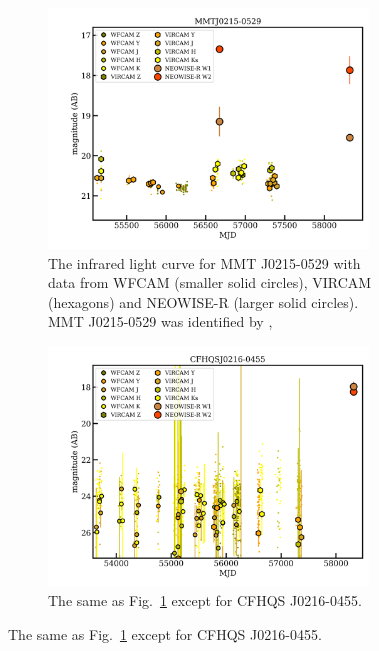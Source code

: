 \documentclass[usenatbib]{mnras}
\begin{document}
\begin{figure}
  \begin{subfigure}{}
    \centering
    \includegraphics[width=8.5cm]{../light_curves/MMTJ0215-0529LC_20190613.png}
    \caption{The infrared light curve for MMT J0215-0529 with data from 
      WFCAM (smaller solid circles), VIRCAM (hexagons) and NEOWISE-R (larger solid circles).
MMT  J0215-0529 was identified by \citet{McGreer2018}, 
}
    \label{fig:MMTJ0215-0529}
  \end{subfigure} 
  \begin{subfigure}{}
    \centering
    \includegraphics[width=8.5cm]{../light_curves/CFHQSJ0216-0455LC_20190613.png}
    \caption{The same as Fig.~\ref{fig:MMTJ0215-0529} except for CFHQS J0216-0455.}
    \label{fig:CFHQSJ0216-0455}
  \end{subfigure}
\end{figure}
\end{document}
